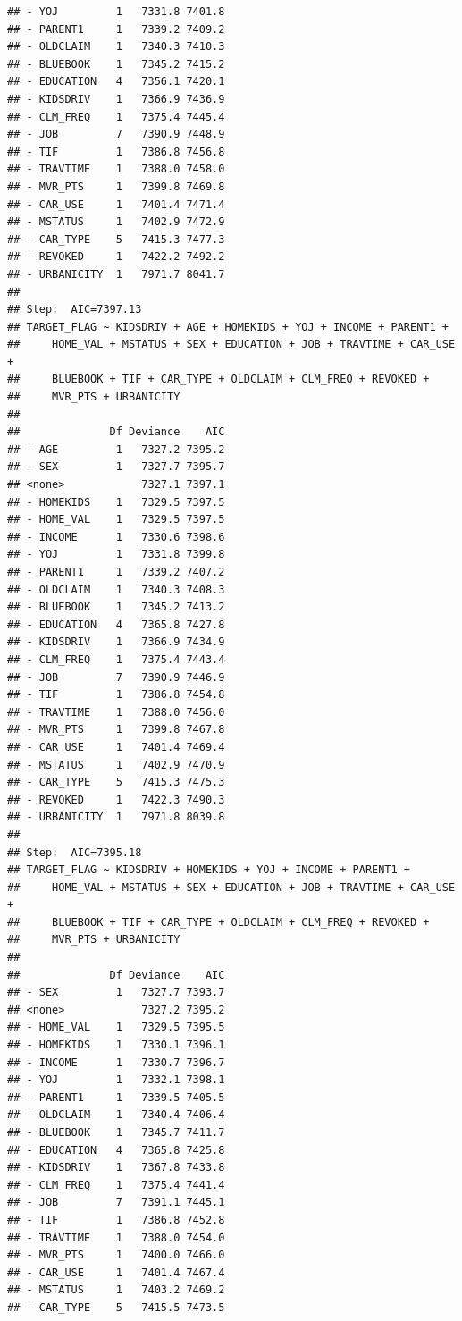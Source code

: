 \documentclass[]{article}
\begin{document}
\begin{verbatim}
## - YOJ         1   7331.8 7401.8
## - PARENT1     1   7339.2 7409.2
## - OLDCLAIM    1   7340.3 7410.3
## - BLUEBOOK    1   7345.2 7415.2
## - EDUCATION   4   7356.1 7420.1
## - KIDSDRIV    1   7366.9 7436.9
## - CLM_FREQ    1   7375.4 7445.4
## - JOB         7   7390.9 7448.9
## - TIF         1   7386.8 7456.8
## - TRAVTIME    1   7388.0 7458.0
## - MVR_PTS     1   7399.8 7469.8
## - CAR_USE     1   7401.4 7471.4
## - MSTATUS     1   7402.9 7472.9
## - CAR_TYPE    5   7415.3 7477.3
## - REVOKED     1   7422.2 7492.2
## - URBANICITY  1   7971.7 8041.7
## 
## Step:  AIC=7397.13
## TARGET_FLAG ~ KIDSDRIV + AGE + HOMEKIDS + YOJ + INCOME + PARENT1 + 
##     HOME_VAL + MSTATUS + SEX + EDUCATION + JOB + TRAVTIME + CAR_USE + 
##     BLUEBOOK + TIF + CAR_TYPE + OLDCLAIM + CLM_FREQ + REVOKED + 
##     MVR_PTS + URBANICITY
## 
##              Df Deviance    AIC
## - AGE         1   7327.2 7395.2
## - SEX         1   7327.7 7395.7
## <none>            7327.1 7397.1
## - HOMEKIDS    1   7329.5 7397.5
## - HOME_VAL    1   7329.5 7397.5
## - INCOME      1   7330.6 7398.6
## - YOJ         1   7331.8 7399.8
## - PARENT1     1   7339.2 7407.2
## - OLDCLAIM    1   7340.3 7408.3
## - BLUEBOOK    1   7345.2 7413.2
## - EDUCATION   4   7365.8 7427.8
## - KIDSDRIV    1   7366.9 7434.9
## - CLM_FREQ    1   7375.4 7443.4
## - JOB         7   7390.9 7446.9
## - TIF         1   7386.8 7454.8
## - TRAVTIME    1   7388.0 7456.0
## - MVR_PTS     1   7399.8 7467.8
## - CAR_USE     1   7401.4 7469.4
## - MSTATUS     1   7402.9 7470.9
## - CAR_TYPE    5   7415.3 7475.3
## - REVOKED     1   7422.3 7490.3
## - URBANICITY  1   7971.8 8039.8
## 
## Step:  AIC=7395.18
## TARGET_FLAG ~ KIDSDRIV + HOMEKIDS + YOJ + INCOME + PARENT1 + 
##     HOME_VAL + MSTATUS + SEX + EDUCATION + JOB + TRAVTIME + CAR_USE + 
##     BLUEBOOK + TIF + CAR_TYPE + OLDCLAIM + CLM_FREQ + REVOKED + 
##     MVR_PTS + URBANICITY
## 
##              Df Deviance    AIC
## - SEX         1   7327.7 7393.7
## <none>            7327.2 7395.2
## - HOME_VAL    1   7329.5 7395.5
## - HOMEKIDS    1   7330.1 7396.1
## - INCOME      1   7330.7 7396.7
## - YOJ         1   7332.1 7398.1
## - PARENT1     1   7339.5 7405.5
## - OLDCLAIM    1   7340.4 7406.4
## - BLUEBOOK    1   7345.7 7411.7
## - EDUCATION   4   7365.8 7425.8
## - KIDSDRIV    1   7367.8 7433.8
## - CLM_FREQ    1   7375.4 7441.4
## - JOB         7   7391.1 7445.1
## - TIF         1   7386.8 7452.8
## - TRAVTIME    1   7388.0 7454.0
## - MVR_PTS     1   7400.0 7466.0
## - CAR_USE     1   7401.4 7467.4
## - MSTATUS     1   7403.2 7469.2
## - CAR_TYPE    5   7415.5 7473.5

\end{verbatim}
\end{document}
